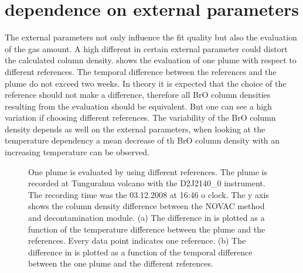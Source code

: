 \documentclass  [
  paper    = a4,
  BCOR     = 10mm,
  twoside,
  fontsize = 12pt,
  fleqn,
  toc      = bibnumbered,
  toc      = listofnumbered,
  numbers  = noendperiod,
  headings = normal,
  listof   = leveldown,
  version  = 3.03
]                                       {scrreprt}
\begin{document}
	\section{  dependence on external parameters\label{Chap:BrOdep}}
	The external parameters not only influence the fit quality but also the evaluation of the gas amount. A high different in certain external parameter could distort the calculated   column density.  shows the evaluation of one plume with respect to different references. The temporal difference between the references and the plume do not exceed two weeks. In theory it is expected that the choice of  the reference should not make a difference, therefore all BrO column densities resulting from the evaluation should be equivalent. But one can see a high variation if choosing different references. The variability of the BrO column density depends as well on the external parameters, when looking at the temperature dependency a mean decrease of th BrO column density with an increasing temperature can be observed.
		\begin{figure}
		\caption{One plume is evaluated by using different references. The plume is recorded at Tungurahua volcano with the D2J2140\_0 instrument. The recording time was the  03.12.2008  at 16:46 o clock. The y axis shows the   column density difference between the NOVAC method and decontamination module. (a) The difference in   is plotted as a function of the temperature difference between the plume and the references. Every data point indicates one reference. (b) The difference in   is plotted as a function of the temporal difference between the one plume and the different references.}
		\label{fig:d2j2140060218difftemperature-cbro}		
	\end{figure}
\end{document}
